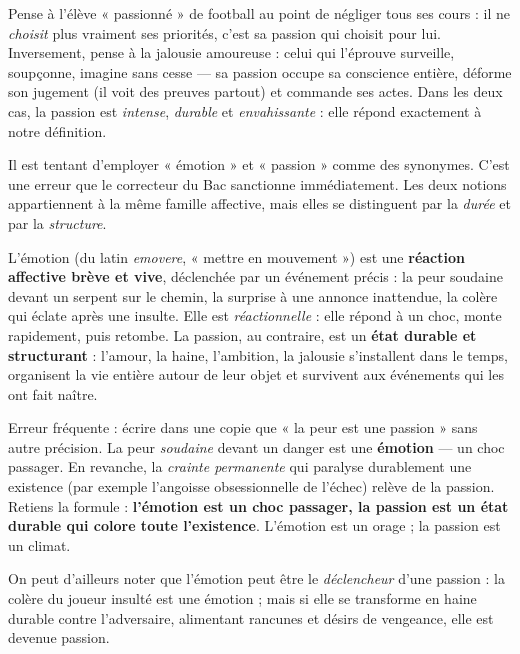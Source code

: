 \documentclass[11pt]{article}
\newcommand{\cle}[1]{{\popxbold\color{popdark}#1}}
\newcounter{popsec}
\newcounter{popsub}
\newcommand{\courssub}[1]{%
  \stepcounter{popsub}%
  \par\vspace{9pt}\noindent{\popxbold\fontsize{11.5}{13}\selectfont\color{popink}{\color{poporange}\thepopsec.\thepopsub}\hspace{6pt}#1}\par\nopagebreak\vspace{4pt}
}
\begin{document}
\begin{exemplebox}
Pense à l'élève « passionné » de football au point de négliger tous ses cours : il ne \emph{choisit} plus vraiment ses priorités, c'est sa passion qui choisit pour lui. Inversement, pense à la jalousie amoureuse : celui qui l'éprouve surveille, soupçonne, imagine sans cesse — sa passion occupe sa conscience entière, déforme son jugement (il voit des preuves partout) et commande ses actes. Dans les deux cas, la passion est \emph{intense}, \emph{durable} et \emph{envahissante} : elle répond exactement à notre définition.
\end{exemplebox}

\courssub{Première distinction : passion et émotion}

Il est tentant d'employer « émotion » et « passion » comme des synonymes. C'est une erreur que le correcteur du Bac sanctionne immédiatement. Les deux notions appartiennent à la même famille affective, mais elles se distinguent par la \emph{durée} et par la \emph{structure}.

L'\cle{émotion} (du latin \emph{emovere}, « mettre en mouvement ») est une \textbf{réaction affective brève et vive}, déclenchée par un événement précis : la peur soudaine devant un serpent sur le chemin, la surprise à une annonce inattendue, la colère qui éclate après une insulte. Elle est \emph{réactionnelle} : elle répond à un choc, monte rapidement, puis retombe. La \cle{passion}, au contraire, est un \textbf{état durable et structurant} : l'amour, la haine, l'ambition, la jalousie s'installent dans le temps, organisent la vie entière autour de leur objet et survivent aux événements qui les ont fait naître.

\begin{attention}
Erreur fréquente : écrire dans une copie que « la peur est une passion » sans autre précision. La peur \emph{soudaine} devant un danger est une \textbf{émotion} — un choc passager. En revanche, la \emph{crainte permanente} qui paralyse durablement une existence (par exemple l'angoisse obsessionnelle de l'échec) relève de la passion. Retiens la formule : \textbf{l'émotion est un choc passager, la passion est un état durable qui colore toute l'existence}. L'émotion est un orage ; la passion est un climat.
\end{attention}

On peut d'ailleurs noter que l'émotion peut être le \emph{déclencheur} d'une passion : la colère du joueur insulté est une émotion ; mais si elle se transforme en haine durable contre l'adversaire, alimentant rancunes et désirs de vengeance, elle est devenue passion.
\end{document}
